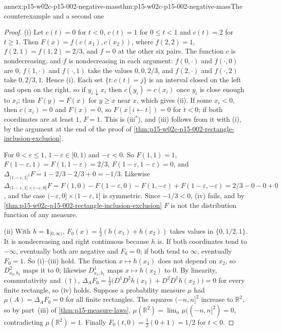 \begin{annexitem}{annex:p15-w02c-p15-002-negative-mass}{thm:p15-w02c-p15-002-negative-mass}{The counterexample and a second one}
\begin{proof}
(i) Let \(c(t)=0\) for \(t<0\), \(c(t)=1\) for \(0\leq t<1\) and
\(c(t)=2\) for \(t\geq1\). Then \(F(x)=f(c(x_1),c(x_2))\), where
\(f(2,2)=1\), \(f(2,1)=f(1,2)=2/3\), and \(f=0\) at the other six pairs.
The function \(c\) is nondecreasing, and \(f\) is nondecreasing in each
argument: \(f(0,\cdot)\) and \(f(\cdot,0)\) are \(0\), \(f(1,\cdot)\) and
\(f(\cdot,1)\) take the values \(0,0,2/3\), and \(f(2,\cdot)\) and
\(f(\cdot,2)\) take \(0,2/3,1\). Hence (i). Each set
\(\{t:c(t)=j\}\) is an interval closed on the left and open on the right,
so if \(y_i\downarrow x_i\) then \(c(y_i)=c(x_i)\) once \(y_i\) is close
enough to \(x_i\); thus \(F(y)=F(x)\) for \(y\geq x\) near \(x\), which
gives (ii). If some \(x_i<0\), then \(c(x_i)=0\) and \(F(x)=0\), so
\(F(x[i\gets t])=0\) for \(t<0\); if both coordinates are at least \(1\),
\(F=1\). This is (iii\(^*\)), and (iii) follows from it with (i), by the
argument at the end of the proof of
\cref{thm:p15-w02c-p15-002-rectangle-inclusion-exclusion}.

For \(0<\varepsilon\leq1\), \(1-\varepsilon\in[0,1)\) and
\(-\varepsilon<0\). So \(F(1,1)=1\), \(F(1-\varepsilon,1)=F(1,1-\varepsilon)=2/3\),
\(F(1-\varepsilon,1-\varepsilon)=0\), and
\(\Delta_{(1-\varepsilon,1]^2}F=1-2/3-2/3+0=-1/3\). Likewise
\(\Delta_{(1-\varepsilon,1]\times(-\varepsilon,0]}F
 =F(1,0)-F(1-\varepsilon,0)-F(1,-\varepsilon)+F(1-\varepsilon,-\varepsilon)
 =2/3-0-0+0\), and the case \((-\varepsilon,0]\times(1-\varepsilon,1]\) is
symmetric. Since \(-1/3<0\), (iv) fails, and by
\cref{thm:p15-w02c-p15-002-rectangle-inclusion-exclusion} \(F\) is not the
distribution function of any measure.

(ii) With \(h=\mathbf1_{[0,\infty)}\), \(F_0(x)=\frac12(h(x_1)+h(x_2))\)
takes values in \(\{0,1/2,1\}\). It is nondecreasing and right continuous
because \(h\) is. If both coordinates tend to \(-\infty\), eventually both
are negative and \(F_0=0\); if both tend to \(\infty\), eventually
\(F_0=1\). So (i)--(iii) hold. The function \(x\mapsto h(x_1)\) does not
depend on \(x_2\), so \(D^2_{a_2,b_2}\) maps it to \(0\); likewise
\(D^1_{a_1,b_1}\) maps \(x\mapsto h(x_2)\) to \(0\). By linearity,
commutativity and \((\dagger)\),
\(\Delta_AF_0=\frac12\bigl(D^1D^2h(x_1)+D^2D^1h(x_2)\bigr)=0\) for every
finite rectangle, so (iv) holds. Suppose a probability measure \(\mu\) had
\(\mu(A)=\Delta_AF_0=0\) for all finite rectangles. The squares
\((-n,n]^2\) increase to \(\mathbb R^2\), so by part~(iii) of
\cref{thm:p15-measure-laws},
\(\mu(\mathbb R^2)=\lim_n\mu((-n,n]^2)=0\), contradicting
\(\mu(\mathbb R^2)=1\). Finally \(F_0(t,0)=\frac12(0+1)=1/2\) for \(t<0\).
\end{proof}
\end{annexitem}


